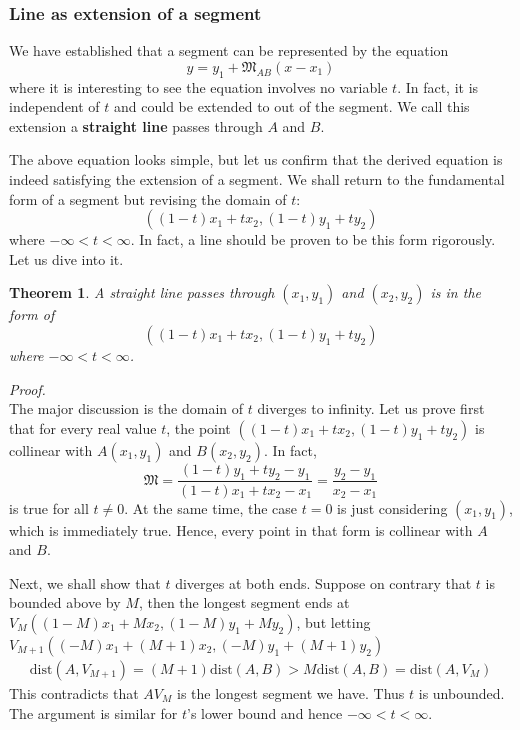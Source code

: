 \documentclass[12pt]{article}
\newtheorem*{theorem}{Theorem}
\renewenvironment{proof}[1][Proof]{\begin{snugshade*} \textit{{#1}.}\\}{\hfill \qedsymbol \end{snugshade*}}
\begin{document}
    \subsubsection*{Line as extension of a segment}

    We have established that a segment can be represented by the equation $$y=y_1+\mathfrak{M}_{AB}(x-x_1)$$
    where it is interesting to see the equation involves no variable $t$. In fact, it is independent of $t$ and could be extended to out of the segment. We call this extension a \textbf{straight line} passes through $A$ and $B$.

    The above equation looks simple, but let us confirm that the derived equation is indeed satisfying the extension of a segment. We shall return to the fundamental form of a segment but revising the domain of $t$: $$((1-t)x_1+tx_2, (1-t)y_1+ty_2)$$ where $-\infty<t<\infty$. In fact, a line should be proven to be this form rigorously. Let us dive into it.

    \begin{theorem}
        A straight line passes through $(x_1,y_1)$ and $(x_2, y_2)$ is in the form of $$((1-t)x_1+tx_2, (1-t)y_1+ty_2)$$ where $-\infty<t<\infty$.
    \end{theorem}

    \begin{proof}
        The major discussion is the domain of $t$ diverges to infinity. Let us prove first that for every real value $t$, the point $((1-t)x_1+tx_2, (1-t)y_1+ty_2)$ is collinear with $A(x_1,y_1)$ and $B(x_2,y_2)$. In fact, $$\mathfrak{M}=\frac{(1-t)y_1+ty_2-y_1}{(1-t)x_1+tx_2-x_1}=\frac{y_2-y_1}{x_2-x_1}$$ is true for all $t\neq 0$. At the same time, the case $t=0$ is just considering $(x_1,y_1)$, which is immediately true. Hence, every point in that form is collinear with $A$ and $B$.

        Next, we shall show that $t$ diverges at both ends. Suppose on contrary that $t$ is bounded above by $M$, then the longest segment ends at $V_M((1-M)x_1+Mx_2, (1-M)y_1+My_2)$, but letting $V_{M+1}((-M)x_1+(M+1)x_2, (-M)y_1+(M+1)y_2)$\begin{align*}
            \mathrm{dist}(A,V_{M+1})=(M+1)\mathrm{dist}(A,B)>M\mathrm{dist}(A,B)=\mathrm{dist}(A,V_M)
        \end{align*}
        This contradicts that $AV_M$ is the longest segment we have. Thus $t$ is unbounded. The argument is similar for $t$'s lower bound and hence $-\infty<t<\infty$.
    \end{proof}
\end{document}
